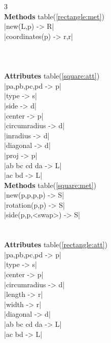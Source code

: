 \documentclass[DIV         = 14,
               fontsize    = 10,
               index       = totoc,
               twoside,
               cadre,
               headings    = small
               ]{tkz-doc}
\begin{document}
\begin{multicols}{3}
 \\
 \textbf{Methods} table(\ref{rectangle:met}) \\
|new(L,p)                  -> R|   \\ 
|coordinates(p)          -> r,r|   \\
                                   \\
            \\
                            \\
 \textbf{Attributes} table(\ref{square:att}) \\
|pa,pb,pc,pd               -> p|   \\
|type                      -> s|   \\
|side                      -> d|   \\
|center                    -> p|   \\
|circumradius              -> d|   \\
|inradius                  -> d|   \\
|diagonal                  -> d|   \\
|proj                      -> p|   \\
|ab bc cd da               -> L|   \\
|ac bd                     -> L|   \\
 \textbf{Methods} table(\ref{square:met}) \\
|new(p,p,p,p)              -> S|   \\ 
|rotation(p,p)             -> S|   \\
|side(p,p,<swap>)          -> S|   \\
                                   \\
          \\
\textbf{Attributes} table(\ref{rectangle:att}) \\
|pa,pb,pc,pd               -> p|  \\
|type                      -> s|   \\
|center                    -> p|  \\
|circumradius              -> d|   \\
|length                    -> r|   \\
|width                     -> r|   \\
|diagonal                  -> d|   \\
|ab bc cd da               -> L|   \\
|ac bd                     -> L|   \\

\end{multicols}
\end{document}
